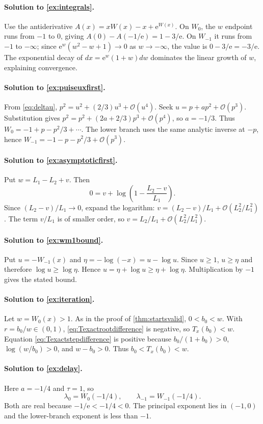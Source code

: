 \documentclass[11pt,oneside]{book}
\theoremstyle{definition}
\theoremstyle{remark}
\newcommand{\ee}{\mathrm e}
\newcommand{\bigO}{\mathcal O}
\begin{document}
\paragraph{Solution to \cref{ex:integrals}.}
Use the antiderivative
$A(x)=xW(x)-x+\ee^{W(x)}$.  On $W_0$, the $w$ endpoint runs from $-1$ to
$0$, giving $A(0)-A(-1/\ee)=1-3/\ee$.  On $W_{-1}$ it runs from $-1$ to
$-\infty$; since $\ee^w(w^2-w+1)\to0$ as $w\to-\infty$, the value is
$0-3/\ee=-3/\ee$.  The exponential decay of $dx=\ee^w(1+w)dw$ dominates
the linear growth of $w$, explaining convergence.

\paragraph{Solution to \cref{ex:puiseuxfirst}.}
From \eqref{eq:deltau},
$p^2=u^2+(2/3)u^3+\bigO(u^4)$.  Seek
$u=p+ap^2+\bigO(p^3)$.  Substitution gives
$p^2=p^2+(2a+2/3)p^3+\bigO(p^4)$, so $a=-1/3$.
Thus $W_0=-1+p-p^2/3+\cdots$.  The lower branch uses the same analytic
inverse at $-p$, hence
$W_{-1}=-1-p-p^2/3+\bigO(p^3)$.

\paragraph{Solution to \cref{ex:asymptoticfirst}.}
Put $w=L_1-L_2+v$.  Then
\[
 0=v+\log\left(1-\frac{L_2-v}{L_1}\right).
\]
Since $(L_2-v)/L_1\to0$, expand the logarithm:
$v=(L_2-v)/L_1+\bigO(L_2^2/L_1^2)$.  The term $v/L_1$ is of smaller order,
so $v=L_2/L_1+\bigO(L_2^2/L_1^2)$.

\paragraph{Solution to \cref{ex:wm1bound}.}
Put $u=-W_{-1}(x)$ and $\eta=-\log(-x)=u-\log u$.  Since $u\ge1$,
$u\ge\eta$ and therefore $\log u\ge\log\eta$.  Hence
$u=\eta+\log u\ge\eta+\log\eta$.  Multiplication by $-1$ gives the stated
bound.

\paragraph{Solution to \cref{ex:iteration}.}
Let $w=W_0(x)>1$.  As in the proof of
\cref{thm:startsvalid}, $0<b_0<w$.  With $r=b_0/w\in(0,1)$,
\eqref{eq:Texactrootdifference} is negative, so $T_x(b_0)<w$.
Equation \eqref{eq:Texactstepdifference} is positive because
$b_0/(1+b_0)>0$, $\log(w/b_0)>0$, and $w-b_0>0$.  Thus
$b_0<T_x(b_0)<w$.

\paragraph{Solution to \cref{ex:delay}.}
Here $a=-1/4$ and $\tau=1$, so
\[
 \lambda_0=W_0(-1/4),
 \qquad
 \lambda_{-1}=W_{-1}(-1/4).
\]
Both are real because $-1/\ee<-1/4<0$.  The principal exponent lies in
$(-1,0)$ and the lower-branch exponent is less than $-1$.
\end{document}
